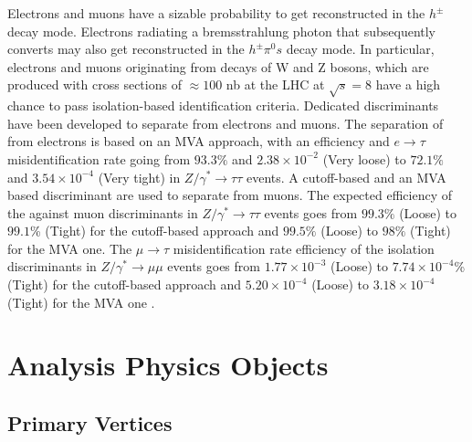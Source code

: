 Electrons and muons have a sizable probability to get reconstructed in the \ensuremath{h^{\pm}} decay mode. Electrons radiating a bremsstrahlung photon that subsequently converts may also get reconstructed in the \ensuremath{h^{\pm}\pi^{0}s} decay mode. In particular, electrons and muons originating from decays of W and Z bosons, which are produced with cross sections of \ensuremath{\approx100} nb at the LHC at \ensuremath{\sqrt{s} = 8} \tev have a high chance to pass isolation-based \hadtau identification criteria. Dedicated discriminants have been developed to separate \hadtau from electrons and muons. The separation of \hadtau from electrons is based on an MVA approach, with an efficiency and \ensuremath{e\to \tau} misidentification rate going from \ensuremath{93.3\%} and \ensuremath{2.38 \times 10^{−2}} (Very loose) to \ensuremath{72.1\%} and \ensuremath{3.54 \times 10^{−4}} (Very tight) in \ensuremath{Z/\gamma^{*} \longrightarrow \tau\tau} events.
A cutoff-based and an MVA based discriminant are used to separate \hadtau from muons. The expected efficiency of the \hadtau against muon discriminants in \ensuremath{Z/\gamma^{*} \longrightarrow \tau\tau} events goes from \ensuremath{99.3\%} (Loose) to \ensuremath{99.1}\% (Tight) for the cutoff-based approach and \ensuremath{99.5\%} (Loose) to \ensuremath{98\%} (Tight) for the MVA one. The \ensuremath{\mu \to \tau} misidentification rate efficiency of the \hadtau isolation discriminants in \ensuremath{Z/\gamma^{*} \longrightarrow \mu\mu} events goes from \ensuremath{1.77 \times 10^{−3}} (Loose) to \ensuremath{7.74 \times 10^{−4}}\% (Tight) for the cutoff-based approach and \ensuremath{5.20 \times 10^{−4}} (Loose) to \ensuremath{3.18 \times 10^{−4}} (Tight) for the MVA one \cite{Khachatryan:2015dfa}.

\section {Analysis Physics Objects}

\subsection{Primary Vertices}
\label{subsec::objsel_vertex}


